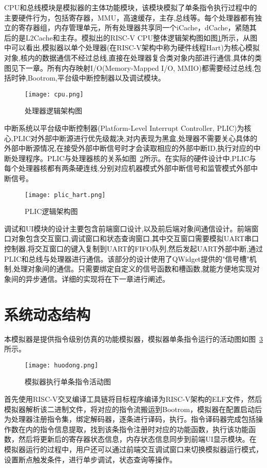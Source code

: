 CPU和总线模块是模拟器的主体功能模块，该模块模拟了单条指令执行过程中的主要硬件行为，包括寄存器，MMU，高速缓存，主存,总线等。每个处理器都有独立的寄存器组，内存管理单元，所有处理器共享同一个iCache，dCache，紧随其后的是L2Cache和主存。模拟出的RISC-V CPU整体逻辑架构图如图\ref{fig:cpu}所示，从图中可以看出,模拟器以单个处理器(在RISC-V架构中称为硬件线程Hart)为核心模拟对象,核内的数据通信不经过总线,直接在处理器复合类对象内部进行通信,具体的类图见下一章。所有内存映射I/O(Memory-Mapped I/O, MMIO)都需要经过总线,包括时钟,Bootrom,平台级中断控制器以及调试模块。
\begin{figure}[H]
  \centering
  \texttt{[image: cpu.png]}
  \caption{处理器逻辑架构图}
  \label{fig:cpu}
\end{figure}


中断系统以平台级中断控制器(Platform-Level Interrupt Controller, PLIC)为核心,PLIC对外部中断源进行优先级裁决,对内表现为黑盒,处理器不需要关心具体的外部中断源情况,在接受外部中断信号时才会读取相应的外部中断ID,执行对应的中断处理程序。PLIC与处理器核的关系如图~\ref{fig:plic-to-hart}所示。在实际的硬件设计中,PLIC与每个处理器核都有两条硬连线,分别对应机器模式外部中断信号和监管模式外部中断信号。
\begin{figure}[H]
  \centering
  \texttt{[image: plic\_hart.png]}
  \caption{PLIC逻辑架构图}
  \label{fig:plic-to-hart}
\end{figure}


调试和UI模块的设计主要包含前端窗口设计,以及前后端对象间通信设计。前端窗口对象包含交互窗口,调试窗口和状态查询窗口,其中交互窗口需要模拟UART串口控制器,将交互窗口的键入复制到UART的FIFO队列,然后发起UART外部中断,通过PLIC和总线与处理器进行通信。该部分的设计使用了QWidget提供的"信号槽"机制,处理对象间的通信。只需要绑定自定义的信号函数和槽函数,就能方便地实现对象间的异步通信。详细的实现将在下一章进行阐述。

\section{系统动态结构}
本模拟器是提供指令级别仿真的功能模拟器，模拟器单条指令运行的活动图如图~\ref{fig:sim-seq1}所示。
\begin{figure}[H]
  \centering
  \texttt{[image: huodong.png]}
  \caption{模拟器执行单条指令活动图}
  \label{fig:sim-seq1}
\end{figure}


首先使用RISC-V交叉编译工具链将目标程序编译为RISC-V架构的ELF文件，然后模拟器解析该二进制文件，将对应的指令流搬运到Bootrom，模拟器在配置启动后为处理器注册指令集，绑定解码器，逐条进行译码，执行。指令译码器完成包括操作数在内的指令信息提取，找到该条指令注册时对应的功能函数，执行该功能函数，然后将更新后的寄存器状态信息，内存状态信息同步到前端UI显示模块。在模拟器运行的过程中，用户还可以通过前端交互调试窗口来切换模拟器运行模式，设置断点触发条件，进行单步调试，状态查询等操作。


